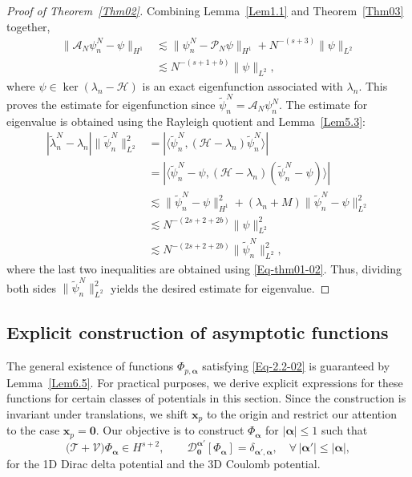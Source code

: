 \documentclass{sn-jnl}%
\numberwithin{equation}{section}
\theoremstyle{thmstyleone}%
\theoremstyle{thmstyletwo}%
\theoremstyle{thmstylethree}%
\begin{document}
\begin{proof}[Proof of Theorem~\ref{Thm02}]
    Combining Lemma~\ref{Lem1.1} and Theorem~\ref{Thm03} together,
    \begin{equation}\label{Eq-thm01-02}
    \begin{aligned}
        \|\mathcal{A}_N\psi_n^N-\psi\|_{H^1} 
        &\lesssim \|\psi_n^N-\mathcal{P}_N\psi\|_{H^1} + N^{-(s+3)}\|\psi\|_{L^2}\\
        &\lesssim N^{-(s+1+b)}\|\psi\|_{L^2},
    \end{aligned}
    \end{equation}
    where $\psi \in \operatorname{ker}(\lambda_n-\mathcal{H})$ is an exact eigenfunction associated with $\lambda_n$. This proves the estimate for eigenfunction since $\tilde{\psi}_n^N=\mathcal{A}_N\psi_n^N$. The estimate for eigenvalue is obtained using the Rayleigh quotient and Lemma~\ref{Lem5.3}:
     \begin{equation}
    \begin{aligned}
        |\tilde\lambda_n^N-\lambda_n| \|\tilde\psi_n^N\|^2_{L^2}
        &= 
        \left|\langle \tilde\psi_n^N,(\mathcal{H}-\lambda_n)\tilde\psi_n^N\rangle\right|\\
        &=
        \left| \langle \tilde\psi_n^N-\psi,(\mathcal{H}-\lambda_n)(\tilde\psi_n^N-\psi)\rangle  \right|\\
        &\lesssim 
        \|\tilde\psi_n^N-\psi\|_{H^1}^2 + (\lambda_n+M)\|\tilde\psi_n^N-\psi\|_{L^2}^2\\
        &\lesssim N^{-(2s+2+2b)}\|\psi\|_{L^2}^2\\
        &\lesssim N^{-(2s+2+2b)}\|\tilde\psi_n^N\|_{L^2}^2,
    \end{aligned}
    \end{equation}
    where the last two inequalities are obtained using \eqref{Eq-thm01-02}. Thus, dividing both sides $\|\tilde\psi_n^N\|_{L^2}^2$ yields the desired estimate for eigenvalue.
\end{proof}

\subsection{Explicit construction of asymptotic functions}
\label{subsec:3.2}




The general existence of functions $\Phi_{p,\bm \alpha}$ satisfying \eqref{Eq-2.2-02} is guaranteed by Lemma~\ref{Lem6.5}. For practical purposes, we derive explicit expressions for these functions for certain classes of potentials in this section. Since the construction is invariant under translations, we shift $\bm x_p$ to the origin and restrict our attention to the case $\bm x_p=\bm 0$. Our objective is to construct $\Phi_{\bm \alpha} $ for $ |\bm \alpha|\leq 1$ such that
 \begin{equation}\label{Eq-3.2-01}
\bigl(\mathcal{T}+\mathcal{V}\bigr)\Phi_{\bm \alpha}\in H^{s+2},\qquad          \mathcal{D}^{\bm \alpha'}_{\bm 0}[\Phi_{\bm \alpha}] = \delta_{\bm \alpha',\bm \alpha},\quad \forall\, |\bm\alpha'|\leq |\bm \alpha|,
 \end{equation}
for the 1D Dirac delta potential and the 3D Coulomb potential.
\end{document}
